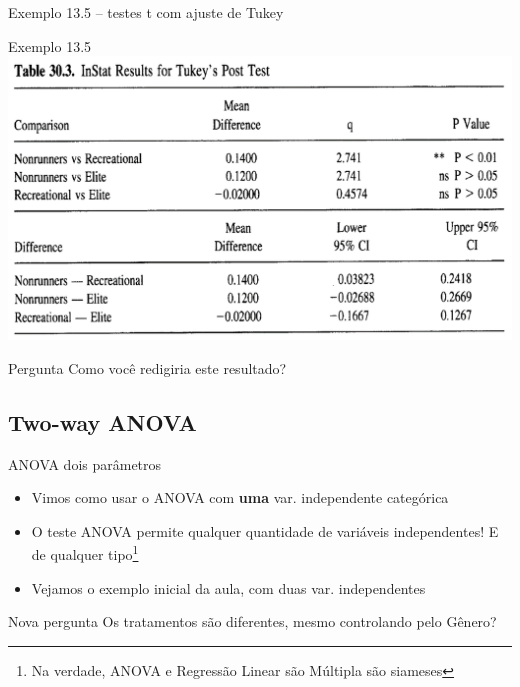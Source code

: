\documentclass{beamer}
\begin{document}

\begin{frame}{\scriptsize \small Exemplo 13.5 -- testes t com ajuste de Tukey}
  \begin{exampleblock}{Exemplo 13.5}
    \includegraphics[width=\textwidth]{Cap13-30/exemplo13_5-4}
  \end{exampleblock}
  \begin{block}{Pergunta}
    \footnotesize
    Como você redigiria este resultado?
  \end{block}
\end{frame}

\subsection{Two-way ANOVA}

\begin{frame}{\scriptsize ANOVA dois parâmetros}
  \begin{itemize}
    \footnotesize
  \item Vimos como usar o ANOVA com {\bf uma} var. independente categórica
    \bigskip
  \item O teste ANOVA permite qualquer quantidade de variáveis independentes! E de qualquer tipo\footnote{\scriptsize Na verdade, ANOVA e Regressão Linear são Múltipla são siameses}
    \bigskip
    \bigskip
  \item Vejamos o exemplo inicial da aula, com duas var. independentes
  \end{itemize}
  \begin{block}{Nova pergunta}
    \small
    Os tratamentos são diferentes, mesmo controlando pelo Gênero?
  \end{block}
\end{frame}
\end{document}
